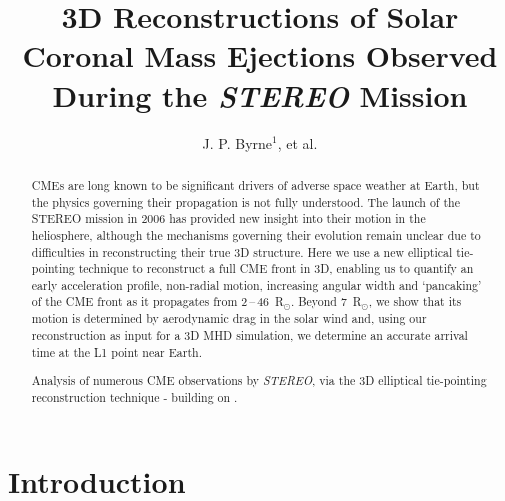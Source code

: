 \documentclass[preprint2]{aastex}
\begin{document}
\title{3D Reconstructions of Solar Coronal Mass Ejections Observed During the \emph{STEREO} Mission}

\author{J. P. Byrne$^{1}$, et al.} %


\begin{abstract}

CMEs are long known to be significant drivers of adverse space weather at Earth, but the physics governing their propagation is not fully understood. The launch of the STEREO mission in 2006 has provided new insight into their motion in the heliosphere, although the mechanisms governing their evolution remain unclear due to difficulties in reconstructing their true 3D structure. Here we use a new elliptical tie-pointing technique to reconstruct a full CME front in 3D, enabling us to quantify an early acceleration profile, non-radial motion, increasing angular width and `pancaking' of the CME front as it propagates from 2\,--\,46~R$_{\odot}$. Beyond 7~R$_{\odot}$, we show that its motion is determined by aerodynamic drag in the solar wind and, using our reconstruction as input for a 3D MHD simulation, we determine an accurate arrival time at the L1 point near Earth.

Analysis of numerous CME observations by \emph{STEREO}, via the 3D elliptical tie-pointing reconstruction technique - building on \citet{2010NatCo...1E..74B}.
\end{abstract}



\section{Introduction}
\end{document}
